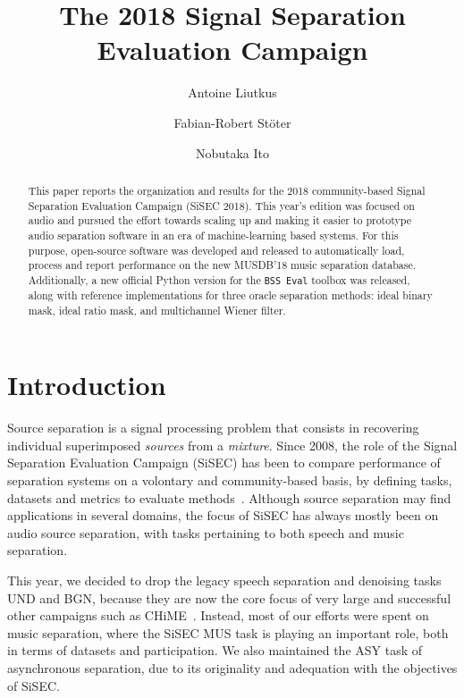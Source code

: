 \documentclass{llncs}
\begin{document}
\title{The 2018 Signal Separation Evaluation Campaign}
\author{
Antoine Liutkus \and
Fabian-Robert St\"{o}ter \and
Nobutaka Ito
}


\maketitle
%
\vspace{-3mm}
\begin{abstract}
This paper reports the organization and results for the 2018 community-based Signal Separation Evaluation Campaign (SiSEC 2018). This year's edition was focused on audio and pursued the effort towards scaling up and making it easier to prototype audio separation software in an era of machine-learning based systems. For this purpose, open-source software was developed and released to automatically load, process and report performance on the new MUSDB'18 music separation database. Additionally, a new official Python version for the \texttt{BSS~Eval} toolbox was released, along with reference implementations for three oracle separation methods: ideal binary mask, ideal ratio mask, and multichannel Wiener filter.
\end{abstract}

\setcounter{footnote}{0}
\section{Introduction}
\vspace{-2mm}
Source separation is a signal processing problem that consists in recovering individual superimposed \textit{sources} from a \textit{mixture}.  Since 2008, the role of the Signal Separation Evaluation Campaign (SiSEC) has been to compare performance of separation systems on a volontary and community-based basis, by defining tasks, datasets and metrics to evaluate methods~\cite{sassec2007,sisec2008,sisec0710,sisec2011,sisec2013,sisec2015,sisec2016}. Although source separation may find applications in several domains, the focus of SiSEC has always mostly been on audio source separation, with tasks pertaining to both speech and music separation.

This year, we decided to drop the legacy speech separation and denoising tasks UND and BGN, because they are now the core focus of very large and successful other campaigns such as CHiME~\cite{chime,chime2,chime3}. Instead, most of our efforts were spent on music separation, where the SiSEC MUS task is playing an important role, both in terms of datasets and participation. We also maintained the ASY task of asynchronous separation, due to its originality and adequation with the objectives of SiSEC.
\end{document}

